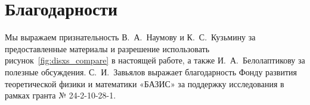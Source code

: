\section*{Благодарности}
Мы выражаем признательность В.~А.~Наумову и К.~С.~Кузьмину за предоставленные материалы и разрешение использовать рисунок~\ref{fig:disxs_compare} в настоящей работе, а также И.~А.~Белолаптикову за полезные обсуждения.
С.~И.~Завьялов выражает благодарность Фонду развития теоретической физики и математики «БАЗИС» за поддержку исследования в рамках гранта № 24-2-10-28-1.